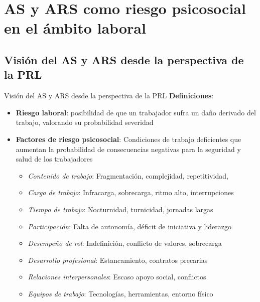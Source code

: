 \documentclass{beamer}
\begin{document}
    \section{AS y ARS como riesgo psicosocial en el ámbito laboral}

    \subsection{Visión del AS y ARS desde la perspectiva de la PRL}
    \begin{frame}{Visión del AS y ARS desde la perspectiva de la PRL}
        \textbf{Definiciones}:
        \begin{itemize}
            \item \textbf{Riesgo laboral}: posibilidad de que un trabajador sufra un daño derivado del trabajo, valorando su probabilidad severidad
            \item \textbf{Factores de riesgo psicosocial}: Condiciones de trabajo deficientes que aumentan la probabilidad de consecuencias negativas para la seguridad y salud de los trabajadores
            \begin{itemize}
                \item \textit{Contenido de trabajo}: Fragmentación, complejidad, repetitividad,
                \item \textit{Carga de trabajo}: Infracarga, sobrecarga, ritmo alto, interrupciones
                \item \textit{Tiempo de trabajo}: Nocturnidad, turnicidad, jornadas largas
                \item \textit{Participación}: Falta de autonomía, déficit de iniciativa y liderazgo
                \item \textit{Desempeño de rol}: Indefinición, conflicto de valores, sobrecarga
                \item \textit{Desarrollo profesional}: Estancamiento, contratos precarias
                \item \textit{Relaciones interpersonales}: Escaso apoyo social, conflictos
                \item \textit{Equipos de trabajo}: Tecnologías, herramientas, entorno físico
            \end{itemize}
        \end{itemize}
    \end{frame}
\end{document}
